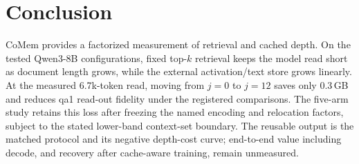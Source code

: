 \section{Conclusion}
\label{sec:conclusion}

CoMem provides a factorized measurement of retrieval and cached depth.  On the
tested Qwen3-8B configurations, fixed top-$k$ retrieval keeps the model read short
as document length grows, while the external activation/text store grows linearly.
At the measured 6.7k-token read, moving from $j{=}0$ to $j{=}12$ saves only
0.3\,GB and reduces qa1 read-out fidelity under the registered comparisons.  The
five-arm study retains this loss after freezing the named encoding and relocation
factors, subject to the stated lower-band context-set boundary.  The reusable output
is the matched protocol and its negative depth-cost curve; end-to-end value including
decode, and recovery after cache-aware training, remain unmeasured.
